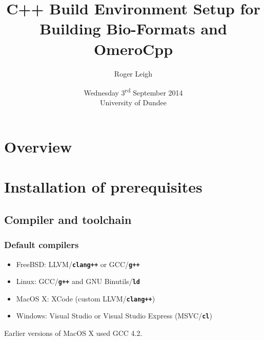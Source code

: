 \documentclass{beamer}
\title{C++ Build Environment Setup for Building Bio-Formats and OmeroCpp}
\author{Roger Leigh}
\date{Wednesday 3\textsuperscript{rd} September 2014\\University of Dundee}
\newcommand{\cmd}[1]{\textbf{\texttt{#1}}}
\begin{document}
\begin{frame}[plain]
  \titlepage
  \begin{center}
     \hfill
    \hfill
  \end{center}
\end{frame}

\section[]{Overview}

\section{Installation of prerequisites}
\subsection{Compiler and toolchain}
\begin{frame}
  \frametitle{Default compilers}
  \begin{itemize}
  \item FreeBSD: LLVM/\cmd{clang++} or GCC/\cmd{g++}
  \item Linux: GCC/\cmd{g++} and GNU Binutils/\cmd{ld}
  \item MacOS X: XCode (custom LLVM/\cmd{clang++})
  \item Windows: Visual Studio or Visual Studio Express (MSVC/\cmd{cl})
  \end{itemize}

  Earlier versions of MacOS X used GCC 4.2.
\end{frame}
\end{document}
